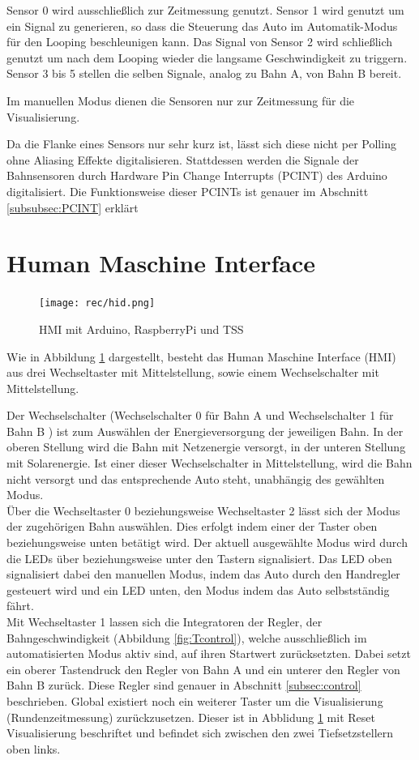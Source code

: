 \documentclass[a4paper, 11pt]{report}
\begin{document}
		Sensor 0 wird ausschließlich zur Zeitmessung genutzt.
		Sensor 1 wird genutzt um ein Signal zu generieren, so dass die Steuerung das Auto im Automatik-Modus für den Looping beschleunigen kann.
		Das Signal von Sensor 2 wird schließlich genutzt um nach dem Looping wieder die langsame Geschwindigkeit zu triggern.\\
		Sensor 3 bis 5 stellen die selben Signale, analog zu Bahn A, von Bahn B bereit.

		Im manuellen Modus dienen die Sensoren nur zur Zeitmessung für die Visualisierung.

		Da die Flanke eines Sensors nur sehr kurz ist, lässt sich diese nicht per Polling ohne Aliasing Effekte digitalisieren. Stattdessen werden die Signale der Bahnsensoren durch Hardware Pin Change Interrupts (PCINT) des Arduino digitalisiert.
		Die Funktionsweise dieser PCINTs ist genauer im Abschnitt \ref{subsubsec:PCINT} erklärt
	\section{Human Maschine Interface}
		\begin{figure}[ht]
			\centering
			\texttt{[image: rec/hid.png]}
			\caption{HMI mit Arduino, RaspberryPi und TSS}

			\label{img:hid}
		\end{figure}
		Wie in Abbildung \ref{img:hid} dargestellt, besteht das Human Maschine Interface (HMI) aus drei Wechseltaster mit Mittelstellung, sowie einem Wechselschalter mit Mittelstellung.

		Der Wechselschalter (\glqq Wechselschalter 0\grqq{} für Bahn A und \glqq Wechselschalter 1\grqq{} für Bahn B ) ist zum Auswählen der Energieversorgung der jeweiligen Bahn. In der oberen Stellung wird die Bahn mit Netzenergie versorgt, in der unteren Stellung mit Solarenergie.
Ist einer dieser Wechselschalter in Mittelstellung, wird die Bahn nicht versorgt und das entsprechende Auto steht, unabhängig des gewählten Modus.\\
		Über die Wechseltaster 0 beziehungsweise Wechseltaster 2 lässt sich der Modus der zugehörigen Bahn auswählen. Dies erfolgt indem einer der Taster oben beziehungsweise unten betätigt wird.  Der aktuell ausgewählte Modus wird durch die LEDs über beziehungsweise unter den Tastern signalisiert. Das LED oben signalisiert dabei den manuellen Modus, indem das Auto durch den Handregler gesteuert wird und ein LED unten, den Modus indem das Auto selbstständig fährt.\\
Mit Wechseltaster 1  lassen sich die Integratoren der Regler, der Bahngeschwindigkeit (Abbildung \ref{fig:Tcontrol}), welche ausschließlich im automatisierten Modus aktiv sind, auf ihren Startwert zurücksetzten. Dabei setzt ein oberer Tastendruck den Regler von Bahn A und ein unterer den Regler von Bahn B zurück. Diese Regler sind genauer in Abschnitt \ref{subsec:control} beschrieben.
Global existiert noch ein weiterer Taster um die Visualisierung (Rundenzeitmessung) zurückzusetzen. Dieser ist in Abblidung \ref{img:hid} mit \glqq Reset Visualisierung\grqq{} beschriftet und befindet sich zwischen den zwei Tiefsetzstellern oben links.
\end{document}
